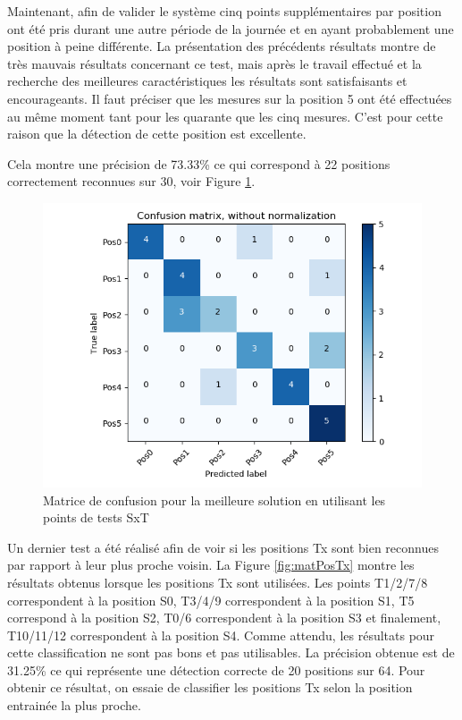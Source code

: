 Maintenant, afin de valider le système cinq points supplémentaires par position ont été pris durant une autre période de la journée et en ayant probablement une position à peine différente. La présentation des précédents résultats montre de très mauvais résultats concernant ce test, mais après le travail effectué et la recherche des meilleures caractéristiques les résultats sont satisfaisants et encourageants. Il faut préciser que les mesures sur la position 5 ont été effectuées au même moment tant pour les quarante que les cinq mesures. C'est pour cette raison que la détection de cette position est excellente. 

Cela montre une précision de 73.33\% ce qui correspond à 22 positions correctement reconnues sur 30, voir Figure \ref{fig:matPosSxT}. 
\begin{figure}[H]
 \begin{center}
  \includegraphics[scale=0.5]{figures/mat_pos_SxT.png}
  \caption{Matrice de confusion pour la meilleure solution en utilisant les points de tests SxT}
  \label{fig:matPosSxT} %
 \end{center}
\end{figure}

Un dernier test a été réalisé afin de voir si les positions Tx sont bien reconnues par rapport à leur plus proche voisin. La Figure \ref{fig:matPosTx} montre les résultats obtenus lorsque les positions Tx sont utilisées. Les points T1/2/7/8 correspondent à la position S0, T3/4/9 correspondent à la position S1, T5 correspond à la position S2, T0/6 correspondent à la position S3 et finalement, T10/11/12 correspondent à la position S4. Comme attendu, les résultats pour cette classification ne sont pas bons et pas utilisables. La précision obtenue est de 31.25\% ce qui représente une détection correcte de 20 positions sur 64. Pour obtenir ce résultat, on essaie de classifier les positions Tx selon la position entrainée la plus proche. 

